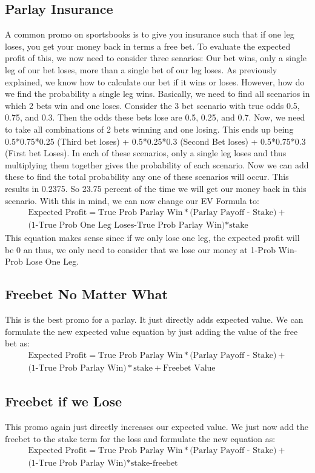 \documentclass{article}
\begin{document}
\subsection{Parlay Insurance}
A common promo on sportsbooks is to give you insurance such that if one leg loses, you get your money back in terms a free bet. To evaluate the expected profit of this, we now need to consider three senarios: Our bet wins, only a single leg of our bet loses, more than a single bet of our leg loses. As previously explained, we know how to calculate our bet if it wins or loses. However, how do we find the probability a single leg wins. Basically, we need to find all scenarios in which 2 bets win and one loses. Consider the 3 bet scenario with true odds 0.5, 0.75, and 0.3. Then the odds these bets lose are 0.5, 0.25, and 0.7. Now, we need to take all combinations of 2 bets winning and one losing. This ends up being 0.5*0.75*0.25 (Third bet loses) + 0.5*0.25*0.3 (Second Bet loses) + 0.5*0.75*0.3 (First bet Loses). In each of these scenarios, only a single leg loses and thus multiplying them together gives the probability of each scenario. Now we can add these to find the total probability any one of these scenarios will occur. This results in 0.2375. So 23.75 percent of the time we will get our money back in this scenario. With this in mind, we can now change our EV Formula to:
\begin{multline}
\textrm{Expected Profit} = \textrm{True Prob Parlay Win}*\textrm{(Parlay Payoff - Stake)} + \\ \textrm{(1-True Prob One Leg Loses-True Prob Parlay Win)}*\textrm{stake}
\end{multline}
This equation makes sense since if we only lose one leg, the expected profit will be 0 an thus, we only need to consider that we lose our money at 1-Prob Win-Prob Lose One Leg.

\subsection{Freebet No Matter What}
This is the best promo for a parlay. It just directly adds expected value. We can formulate the new expected value equation by just adding the value of the free bet as:
\begin{multline}
  \textrm{Expected Profit} = \textrm{True Prob Parlay Win}*\textrm{(Parlay Payoff - Stake)} + \\ \textrm{(1-True Prob Parlay Win)}*\textrm{stake} + \textrm{Freebet Value}
\end{multline}

\subsection{Freebet if we Lose}
This promo again just directly increases our expected value. We just now add the freebet to the stake term for the loss and formulate the new equation as:
\begin{multline}
  \textrm{Expected Profit} = \textrm{True Prob Parlay Win}*\textrm{(Parlay Payoff - Stake)} + \\ \textrm{(1-True Prob Parlay Win)}*\textrm{stake-freebet}
\end{multline}
\end{document}
